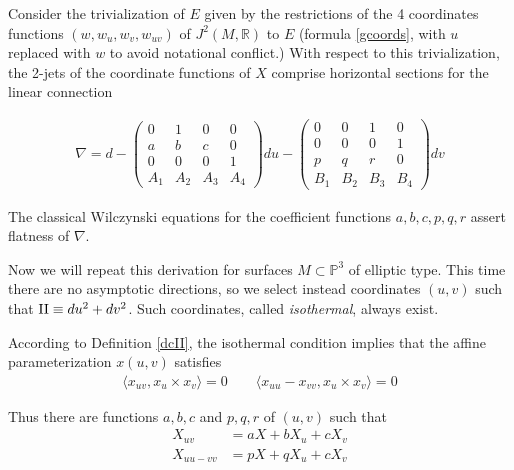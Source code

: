 \documentclass[12pt]{article}
\numberwithin{equation}{section}
\theoremstyle{plain}
\theoremstyle{definition}
\renewcommand{\P}{\mathbb{P}}
\newcommand{\R}{\mathbb{R}}
\newcommand{\II}{\textnormal{II}}
\begin{document}
Consider the trivialization of $E$ given by the restrictions of the 4 coordinates functions $(w,w_{u},w_{v},w_{uv})$ of $J^{2}(M,\R)$ to $E$ (formula \ref{gcoords}, with $u$ replaced with $w$ to avoid notational conflict.) With respect to this trivialization, the 2-jets of the coordinate functions of $X$ comprise horizontal sections for the linear connection

\begin{align*}
\nabla= d -
\begin{pmatrix}
0 & 1 & 0 & 0\\
a & b & c & 0\\
0 & 0 & 0 & 1\\
A_{1}&A_{2}&A_{3}&A_{4}
\end{pmatrix}du
-\begin{pmatrix}
0 & 0 & 1 & 0\\
0 & 0 & 0 & 1\\
p & q & r & 0\\
B_{1}&B_{2}&B_{3}&B_{4}
\end{pmatrix}dv
\end{align*}

The classical Wilczynski equations \cite{wil} for the coefficient functions $a,b,c,p,q,r$ assert flatness of $\nabla$.

Now we will repeat this derivation for surfaces $M\subset \P^{3}$ of elliptic type. This time there are no asymptotic directions, so we select instead coordinates $(u,v)$ such that $\II\equiv du^{2}+dv^{2}$. Such coordinates, called \emph{isothermal}, always exist.

According to Definition \ref{dcII}, the isothermal condition implies that the affine parameterization $x(u,v)$ satisfies
\begin{align*}
\langle x_{uv},x_{u}\times x_{v}\rangle =0 \qquad \langle x_{uu}-x_{vv},x_{u}\times x_{v} \rangle=0
\end{align*}

Thus there are functions $a,b,c$ and $p,q,r$ of $(u,v)$ such that
\begin{align*}
X_{uv} &= a X + b X_{u} + c X_{v}\\
X_{uu-vv}&=p X + q X_{u} + c X_{v}
\end{align*}
\end{document}
